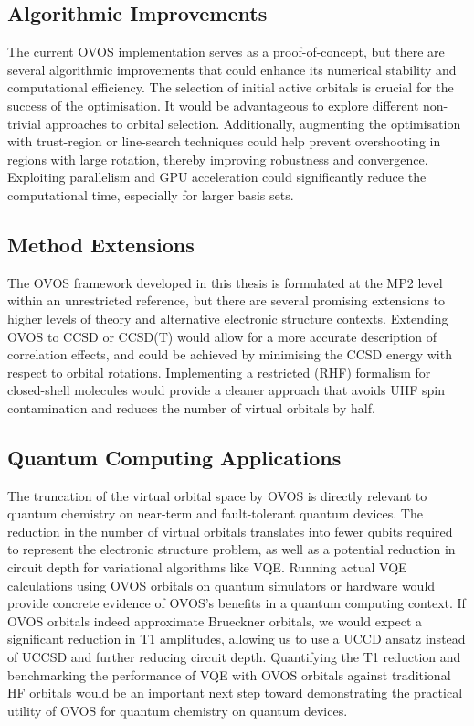 \subsection{Algorithmic Improvements}

The current OVOS implementation serves as a proof-of-concept, but there are several algorithmic improvements that could enhance its numerical stability and computational efficiency. The selection of initial active orbitals is crucial for the success of the optimisation. It would be advantageous to explore different non-trivial approaches to orbital selection. Additionally, augmenting the optimisation with trust-region or line-search techniques could help prevent overshooting in regions with large rotation, thereby improving robustness and convergence. Exploiting parallelism and GPU acceleration could significantly reduce the computational time, especially for larger basis sets. 

\subsection{Method Extensions}

The OVOS framework developed in this thesis is formulated at the MP2 level within an unrestricted reference, but there are several promising extensions to higher levels of theory and alternative electronic structure contexts. Extending OVOS to CCSD or CCSD(T) would allow for a more accurate description of correlation effects, and could be achieved by minimising the CCSD energy with respect to orbital rotations. Implementing a restricted (RHF) formalism for closed-shell molecules would provide a cleaner approach that avoids UHF spin contamination and reduces the number of virtual orbitals by half.


\subsection{Quantum Computing Applications}

The truncation of the virtual orbital space by OVOS is directly relevant to quantum chemistry on near-term and fault-tolerant quantum devices. The reduction in the number of virtual orbitals translates into fewer qubits required to represent the electronic structure problem, as well as a potential reduction in circuit depth for variational algorithms like VQE. Running actual VQE calculations using OVOS orbitals on quantum simulators or hardware would provide concrete evidence of OVOS's benefits in a quantum computing context. If OVOS orbitals indeed approximate Brueckner orbitals, we would expect a significant reduction in T1 amplitudes, allowing us to use a UCCD ansatz instead of UCCSD and further reducing circuit depth. Quantifying the T1 reduction and benchmarking the performance of VQE with OVOS orbitals against traditional HF orbitals would be an important next step toward demonstrating the practical utility of OVOS for quantum chemistry on quantum devices. 

